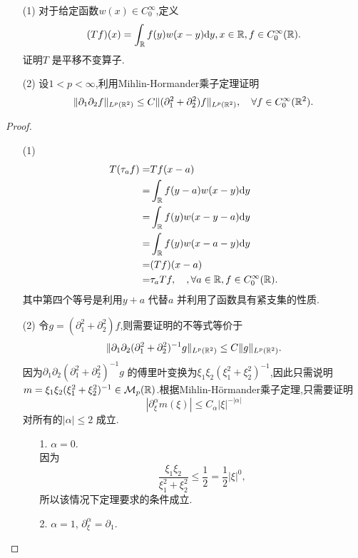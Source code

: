 \begin{exercise}
  \begin{enumerate}
    \item []
    \item [(1)] 对于给定函数$w(x)\in C_0^{\infty}$,定义
      \[
	(Tf)(x)=\int_{\mathbb{R}}f(y)w(x-y)\mathrm{d}y, x\in \mathbb{R},f\in C_0^{\infty}(\mathbb{R}).
      \] 
      证明$T$ 是平移不变算子.
    \item [(2)] 设$1<p<\infty$,利用Mihlin-Hormander乘子定理证明
      \[
	\|\partial_1\partial_2f\|_{L^{p}(\mathbb{R}^2)}\le C\|(\partial_1^2+\partial_2^2)f\|_{L^{p}(\mathbb{R}^2)},\quad \forall f \in C_0^{\infty}(\mathbb{R}^2).
      \] 
  \end{enumerate}
\end{exercise}
\begin{proof}
  \begin{enumerate}
    \item []
    \item [(1)] 
      \begin{align*}
	T(\tau _af) = & Tf(x-a)\\
	= & \int_{\mathbb{R}}f(y-a)w(x-y)\mathrm{d}y\\
	= & \int_{\mathbb{R}}f(y)w(x-y-a)\mathrm{d}y\\
	= & \int_{\mathbb{R}}f(y)w(x-a-y)\mathrm{d}y\\
	= & (Tf)(x-a)\\
	= & \tau _a Tf,\quad,\forall a\in \mathbb{R},f\in C_0^{\infty}(\mathbb{R})
      .\end{align*}
      其中第四个等号是利用$y+a$ 代替$a$ 并利用了函数具有紧支集的性质.
    \item [(2)] 令$g=(\partial_1^2+\partial_2^2)f$,则需要证明的不等式等价于
      \[
	\|\partial_1\partial_2(\partial_1^2+\partial_2^2)^{-1}g\|_{L^{p}(\mathbb{R}^2)}\le C\|g\|_{L^{p}(\mathbb{R}^2)}.
      \] 
      因为$\partial_1\partial_2(\partial_1^2+\partial_2^2)^{-1}g$ 的傅里叶变换为$\xi_1\xi_2(\xi_1^2+\xi_2^2)^{-1}$,因此只需说明$m=\xi_1\xi_2(\xi_1^2+\xi_2^2)^{-1}\in \mathcal{M}_{p}(\mathbb{R})$.根据Mihlin-H\"{o}rmander乘子定理,只需要证明
      \[
	|\partial_{\xi}^{\alpha}m(\xi)|\le C_\alpha |\xi|^{-|\alpha|}
      \] 
      对所有的$|\alpha|\le 2$ 成立.
      \begin{itemize}
	\item [1.] $\alpha=0$.\\
	  因为
	  \[
	    \frac{\xi_1\xi_2}{\xi_1^2+\xi_2^2}\le \frac{1}{2}=\frac{1}{2}|\xi|^{0},
	  \] 
	  所以该情况下定理要求的条件成立.
	\item [2.] $\alpha=1$, $\partial_\xi^{\alpha}=\partial_1.$\\

\end{itemize}
\end{enumerate}
\end{proof}
